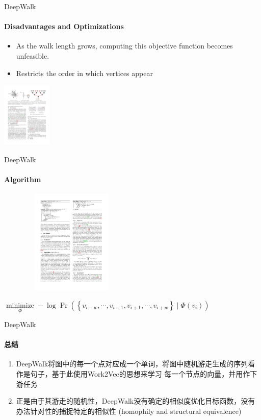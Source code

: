 \documentclass{beamer}
\begin{document}
\begin{frame}{DeepWalk}
    \framesubtitle{Disadvantages and Optimizations}
    \begin{itemize}
        \item As the walk length grows, computing this objective function becomes unfeasible.
        \item Restricts the order in which vertices appear
    \end{itemize}
    \centering\includegraphics[height=3.1cm]{DeepWalk_3.pdf}
\end{frame}
\begin{frame}{DeepWalk}
    \framesubtitle{Algorithm}
    \centering\includegraphics[height=5cm, width=7cm]{DeepWalk_4.pdf}
    \begin{corollary}
        $\underset{\Phi}{\operatorname{minimize}}-\log \operatorname{Pr}\left(\left\{v_{i-w}, \cdots, v_{i-1}, v_{i+1}, \cdots, v_{i+w}\right\} \mid \Phi\left(v_{i}\right)\right)$
    \end{corollary}
\end{frame}
\begin{frame}{DeepWalk}
    \framesubtitle{总结}
    \begin{enumerate}
        \item DeepWalk将图中的每一个点对应成一个单词，将图中随机游走生成的序列看作是句子，基于此使用Work2Vec的思想来学习
              每一个节点的向量，并用作下游任务
        \item 正是由于其游走的随机性，DeepWalk没有确定的相似度优化目标函数，没有办法针对性的捕捉特定的相似性
        (homophily and structural equivalence)
    \end{enumerate}
\end{frame}
\end{document}
